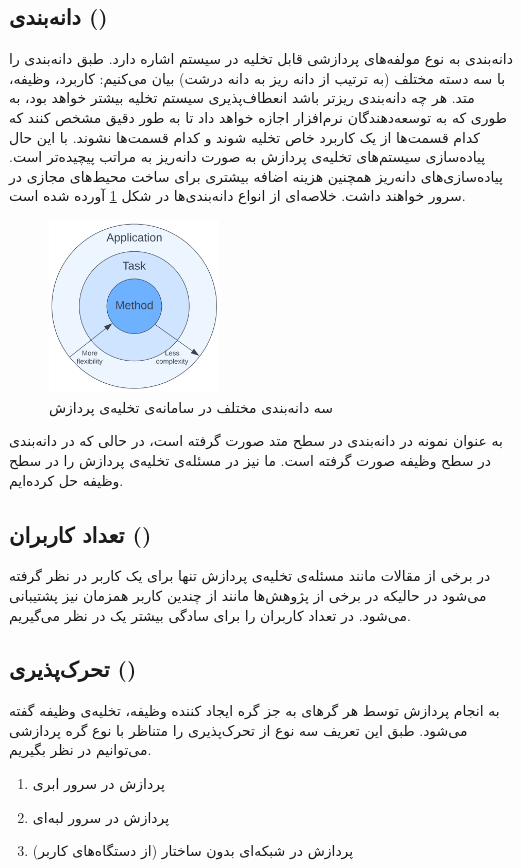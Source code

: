 \subsection*{دانه‌بندی ()}
دانه‌بندی به نوع مولفه‌های پردازشی قابل تخلیه در سیستم اشاره دارد. طبق \cite{wang2019} دانه‌بندی را با سه دسته مختلف (به ترتیب از دانه‌ ریز به دانه ‌درشت) بیان می‌کنیم: کاربرد، وظیفه، متد. هر چه دانه‌بندی ریزتر باشد انعطاف‌پذیری سیستم تخلیه بیشتر خواهد بود، به طوری که به توسعه‌دهندگان نرم‌افزار اجازه خواهد داد تا به طور دقیق مشخص کنند که کدام قسمت‌ها از یک کاربرد خاص تخلیه شوند و کدام قسمت‌ها نشوند. با این حال پیاده‌سازی سیستم‌های تخلیه‌ی پردازش به صورت دانه‌ریز به مراتب پیچیده‌تر است. پیاده‌سازی‌های دانه‌ریز همچنین هزینه اضافه بیشتری برای ساخت محیط‌های مجازی در سرور خواهند داشت. خلاصه‌ای از انواع دانه‌بندی‌ها در شکل \ref{fig:granularity} آورده شده است.
\begin{figure}[H]
	\centering
	\includegraphics[width=0.4\textwidth]{figures/granularity.png}
	\caption{سه دانه‌بندی مختلف در سامانه‌ی تخلیه‌ی پردازش}
	\label{fig:granularity}
\end{figure}
به عنوان نمونه در \cite{maui} دانه‌بندی در سطح متد صورت گرفته است، در حالی که در \cite{Liu} دانه‌بندی در سطح وظیفه صورت گرفته است. ما نیز در \CurrentProject مسئله‌ی تخلیه‌ی پردازش را در سطح وظیفه حل کرده‌ایم.
\newpage
\subsection*{تعداد کاربران ()}
در برخی از مقالات مانند \cite{Liu} مسئله‌ی تخلیه‌ی پردازش تنها برای یک کاربر در نظر گرفته می‌شود در حالیکه در برخی از پژوهش‌ها مانند \cite{multiuser} از چندین کاربر همزمان نیز پشتیبانی می‌شود. در \CurrentProject تعداد کاربران را برای سادگی بیشتر یک در نظر می‌گیریم.

\subsection*{تحرک‌پذیری ()}
به انجام پردازش توسط هر گرهای به جز گره ایجاد کننده وظیفه، تخلیه‌ی وظیفه گفته می‌شود. طبق این تعریف سه نوع از تحرک‌پذیری را متناظر با نوع گره پردازشی می‌توانیم در نظر بگیریم.
\begin{enumerate}
	\item پردازش در سرور ابری
	\item پردازش در سرور لبه‌ای
	\item پردازش در شبکه‌ای بدون ساختار (از دستگاه‌های کاربر)
\end{enumerate}

